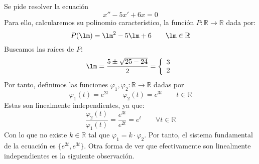 \begin{ejemplo}
    Se pide resolver la ecuación
    \begin{equation*}
        x'' - 5x' + 6x = 0
    \end{equation*}
    Para ello, calcularemos su polinomio característico, la función $P:\mathbb{R}\rightarrow\mathbb{R}$ dada por:
    \begin{equation*}
        P(\lm) = \lm^2 - 5\lm + 6 \qquad \lm \in \mathbb{R}
    \end{equation*}
    Buscamos las raíces de $P$:
    \begin{equation*}
        \lm = \dfrac{5\pm \sqrt{25 - 24}}{2} = \left\{\begin{array}{l}
            3 \\
            2
        \end{array}\right.
    \end{equation*}
    Por tanto, definimos las funciones $\varphi_1,\varphi_2:\mathbb{R}\rightarrow\mathbb{R}$ dadas por
    \begin{equation*}
        \varphi_1(t) = e^{2t} \qquad \varphi_2(t) = e^{3t} \qquad t\in \mathbb{R}
    \end{equation*}
    Estas son linealmente independientes, ya que:
    \begin{equation*}
        \dfrac{\varphi_2(t)}{\varphi_1(t)} = \dfrac{e^{3t}}{e^{2t}} = e^t \qquad \forall t\in \mathbb{R}
    \end{equation*}
    Con lo que no existe $k\in \mathbb{R}$ tal que $\varphi_1 = k \cdot \varphi_2$. Por tanto, el sistema fundamental de la ecuación es $\{e^{2t}, e^{3t}\}$. Otra forma de ver que efectivamente son linealmente independientes es la siguiente observación.
\end{ejemplo}

